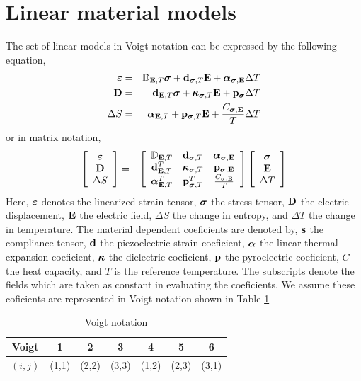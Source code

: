 \newpage
\section{Linear material models}
The set of linear models in Voigt notation can be expressed by the following
equation,
\begin{eqnarray}
\boldsymbol{\varepsilon}   &=& \mathbb{D}_{\mathbf{E},T}\boldsymbol{\sigma} + \mathbf{d}_{\boldsymbol{\sigma},T}   \mathbf{E} + \boldsymbol{\alpha}_{\boldsymbol{\sigma},\mathbf{E}}\Delta T \\
\mathbf{D}    &=& \mathbf{d}_{\mathbf{E},T}\boldsymbol{\sigma} + \boldsymbol{\kappa}_{\boldsymbol{\sigma},T}\mathbf{E} + \mathbf{p}_{\boldsymbol{\sigma}}\Delta T \\
\Delta S&=& \boldsymbol{\alpha}_{\mathbf{E},T}   + \mathbf{p}_{\boldsymbol{\sigma},T}   \mathbf{E} + \frac{C_{\boldsymbol{\sigma},\mathbf{E}}}{T}\Delta T
\end{eqnarray}
or in matrix notation,
\begin{eqnarray}
\left[
\begin{array}{c}
\boldsymbol{\varepsilon}  \\
\mathbf{D}   \\
\Delta S
\end{array}
\right]
&=&
\left[
\begin{array}{ccc}
\mathbb{D}_{\mathbf{E},T}       & \mathbf{d}_{\boldsymbol{\sigma},T}     & \boldsymbol{\alpha}_{\boldsymbol{\sigma},\mathbf{E}}    \\
\mathbf{d}_{\mathbf{E},T}^T    & \boldsymbol{\kappa}_{\boldsymbol{\sigma},T}   & \mathbf{p}_{\boldsymbol{\sigma},\mathbf{E}}       \\
\boldsymbol{\alpha}_{\mathbf{E},T}^T & \mathbf{p}_{\boldsymbol{\sigma},T}^T    & \frac{C_{\boldsymbol{\sigma},\mathbf{E}}}{T}
\end{array}
\right]
\left[
\begin{array}{c}
\boldsymbol{\sigma} \\
\mathbf{E} \\
\Delta T
\end{array}
\right]
\end{eqnarray}
Here,
$\boldsymbol{\varepsilon}$ denotes the linearized strain tensor, $\boldsymbol{\sigma}$ the stress tensor, 
$\mathbf{D}$  the electric displacement, $\mathbf{E}$ the electric field,
$\Delta S$ the change in entropy, and $\Delta T$ the change in temperature.
The material dependent coeficients are denoted by,
$\mathbf{s}$ the compliance tensor, $\mathbf{d}$ the piezoelectric strain coeficient,
$\boldsymbol{\alpha}$ the linear thermal expansion coeficient, 
$\boldsymbol{\kappa}$ the dielectric coeficient, $\mathbf{p}$ the pyroelectric coeficient,
$C$ the heat capacity, and $T$ is the reference temperature. The subscripts 
denote the fields which are taken
as constant in evaluating the coeficients.
We assume these coficients are represented in Voigt notation shown 
in Table \ref{table:VoigtNotation}
\begin{table}[htbp]
\caption{Voigt notation}
\label{table:VoigtNotation}
\begin{center}
\begin{tabular}{|c|cccccc|}
\hline
Voigt    &  1    &  2    &  3    &  4    &   5    &  6   \\
\hline
$(i,j)$  & (1,1) & (2,2) & (3,3) & (1,2) &  (2,3) & (3,1)\\
\hline
\end{tabular}
\end{center}
\end{table}
